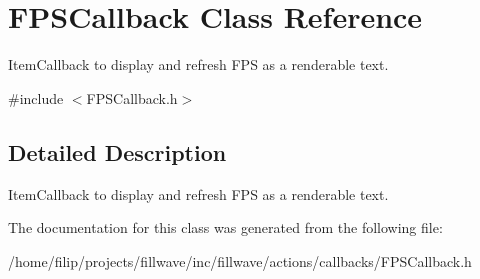 \hypertarget{classFPSCallback}{}\section{F\+P\+S\+Callback Class Reference}
\label{classFPSCallback}


Item\+Callback to display and refresh F\+PS as a renderable text.  




{\ttfamily \#include $<$F\+P\+S\+Callback.\+h$>$}



\subsection{Detailed Description}
Item\+Callback to display and refresh F\+PS as a renderable text. 

The documentation for this class was generated from the following file\+:\begin{DoxyCompactItemize}
\item 
/home/filip/projects/fillwave/inc/fillwave/actions/callbacks/F\+P\+S\+Callback.\+h\end{DoxyCompactItemize}
